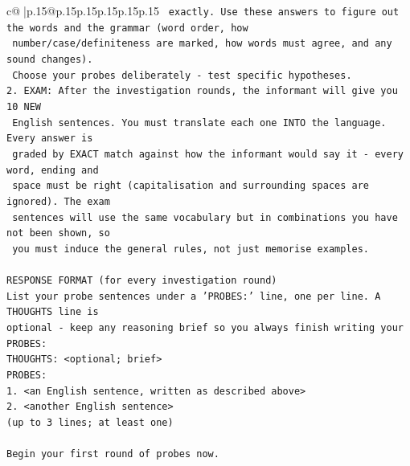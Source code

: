 \documentclass{article}
\begin{document}
{\begin{supertabular}{c@{$\;$}|p{.15\linewidth}@{}p{.15\linewidth}p{.15\linewidth}p{.15\linewidth}p{.15\linewidth}p{.15\linewidth}}
{{{\texttt{   exactly. Use these answers to figure out the words and the grammar (word order, how} \\
\texttt{   number/case/definiteness are marked, how words must agree, and any sound changes).} \\
\texttt{   Choose your probes deliberately {-} test specific hypotheses.} \\
\texttt{2. EXAM: After the investigation rounds, the informant will give you 10 NEW} \\
\texttt{   English sentences. You must translate each one INTO the language. Every answer is} \\
\texttt{   graded by EXACT match against how the informant would say it {-} every word, ending and} \\
\texttt{   space must be right (capitalisation and surrounding spaces are ignored). The exam} \\
\texttt{   sentences will use the same vocabulary but in combinations you have not been shown, so} \\
\texttt{   you must induce the general rules, not just memorise examples.} \\
\\ 
\texttt{RESPONSE FORMAT (for every investigation round)} \\
\texttt{List your probe sentences under a 'PROBES:' line, one per line. A THOUGHTS line is} \\
\texttt{optional {-} keep any reasoning brief so you always finish writing your PROBES:} \\
\texttt{THOUGHTS: <optional; brief>} \\
\texttt{PROBES:} \\
\texttt{1. <an English sentence, written as described above>} \\
\texttt{2. <another English sentence>} \\
\texttt{(up to 3 lines; at least one)} \\
\\ 
\texttt{Begin your first round of probes now.} \\
            }
        }
    }
     \\ \\


\end{supertabular}}
\end{document}

